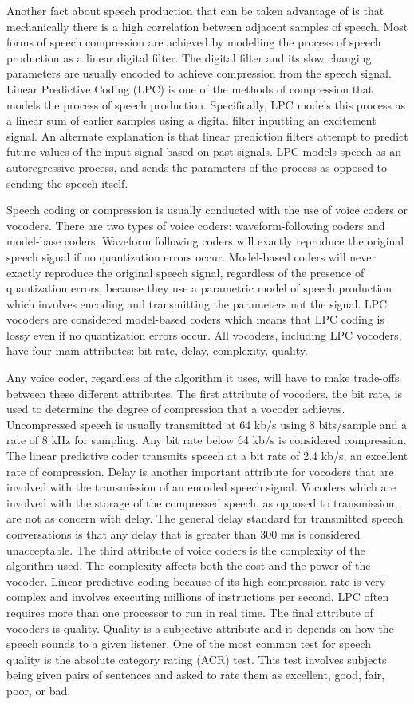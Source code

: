 \documentclass[12pt, a4paper, twoside]{report}
\begin{document}
Another fact about speech production that can be taken advantage of is that mechanically there is a high correlation between adjacent samples of speech. Most forms of speech compression are achieved by modelling the process of speech production as a linear digital filter. The digital filter and its slow changing parameters are usually encoded to achieve compression from the speech signal. Linear Predictive Coding (LPC) is one of the methods of compression that models the process of speech production. Specifically, LPC models this process as a linear sum of earlier samples using a digital filter inputting an excitement signal. An alternate explanation is that linear prediction filters attempt to predict future values of the input signal based on past signals. LPC models speech as an autoregressive process, and sends the parameters of the process as opposed to sending the speech itself.

Speech coding or compression is usually conducted with the use of voice coders or vocoders. There are two types of voice coders: waveform-following coders and model-base coders. Waveform following coders will exactly reproduce the original speech signal if no quantization errors occur. Model-based coders will never exactly reproduce the original speech signal, regardless of the presence of quantization errors, because they use a parametric model of speech production which involves encoding and transmitting the parameters not the signal. LPC vocoders are considered model-based coders which means that LPC coding is lossy even if no quantization errors occur. All vocoders, including LPC vocoders, have four main attributes: bit rate, delay, complexity, quality.

Any voice coder, regardless of the algorithm it uses, will have to make trade-offs between these different attributes. The first attribute of vocoders, the bit rate, is used to determine the degree of compression that a vocoder achieves. Uncompressed speech is usually transmitted at 64 kb/s using 8 bits/sample and a rate of 8 kHz for sampling. Any bit rate below 64 kb/s is considered compression. The linear predictive coder transmits speech at a bit rate of 2.4 kb/s, an excellent rate of compression. Delay is another important attribute for vocoders that are involved with the transmission of an encoded speech signal. Vocoders which are involved with the storage of the compressed speech, as opposed to transmission, are not as concern with delay. The general delay standard for transmitted speech conversations is that any delay that is greater than 300 ms is considered unacceptable. The third attribute of voice coders is the complexity of the algorithm used. The complexity affects both the cost and the power of the vocoder. Linear predictive coding because of its high compression rate is very complex and involves executing millions of instructions per second. LPC often requires more than one processor to run in real time. The final attribute of vocoders is quality. Quality is a subjective attribute and it depends on how the speech sounds to a given listener. One of the most common test for speech quality is the absolute category rating (ACR) test. This test involves subjects being given pairs of sentences and asked to rate them as excellent, good, fair, poor, or bad.
\end{document}
